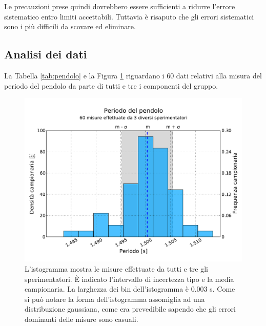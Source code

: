 Le precauzioni prese quindi dovrebbero essere sufficienti a ridurre l'errore sistematico
entro limiti accettabili. Tuttavia è risaputo che gli errori sistematici
sono i più difficili da scovare ed eliminare.

\subsection{Analisi dei dati}

La Tabella \ref{tab:pendolo} e la Figura \ref{fig:pendolo} riguardano i 60 dati
relativi alla misura del periodo del pendolo da parte di tutti e tre i
componenti del gruppo.

\begin{figure}[p]
	\centering
	\includegraphics[width=120mm]{grafici/Pendolo.pdf}
	\caption{L'istogramma mostra le misure effettuate da tutti e tre gli sperimentatori.
        È indicato l'intervallo di incertezza tipo e la media campionaria. La larghezza
        dei bin dell'istogramma è 0.003 s. Come si può notare la forma dell'istogramma
        assomiglia ad una distribuzione gaussiana, come era prevedibile sapendo che gli
        errori dominanti delle misure sono casuali.}
    \label{fig:pendolo}
\end{figure}


